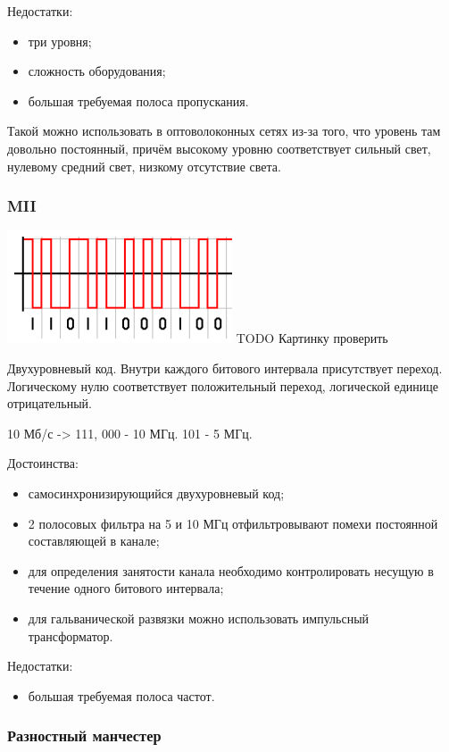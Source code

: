 \documentclass[12pt, russian, oneside, article]{ncc}
\begin{document}
Недостатки:
\begin{itemize}
\item три уровня;
\item сложность оборудования;
\item большая требуемая полоса пропускания.
\end{itemize}

Такой можно использовать в оптоволоконных сетях из-за того, что уровень там довольно постоянный, причём высокому уровню соответствует сильный свет, нулевому средний свет, низкому отсутствие света.
\subsubsection{MII}
\label{sec-4_7_3}


\includegraphics[width=0.5\textwidth]{images/SiSPI/Manchester_code.png}
TODO Картинку проверить

Двухуровневый код. Внутри каждого битового интервала присутствует переход. Логическому нулю соответствует положительный переход, логической единице отрицательный.

10 Мб/с -> 111, 000 - 10 МГц. 101 - 5 МГц.

Достоинства:
\begin{itemize}
\item самосинхронизирующийся двухуровневый код;
\item 2 полосовых фильтра на 5 и 10 МГц отфильтровывают помехи постоянной составляющей в канале;
\item для определения занятости канала необходимо контролировать несущую в течение одного битового интервала;
\item для гальванической развязки можно использовать импульсный трансформатор.
\end{itemize}

Недостатки:
\begin{itemize}
\item большая требуемая полоса частот.
\end{itemize}
\subsubsection{Разностный манчестер}
\label{sec-4_7_4}
\end{document}
